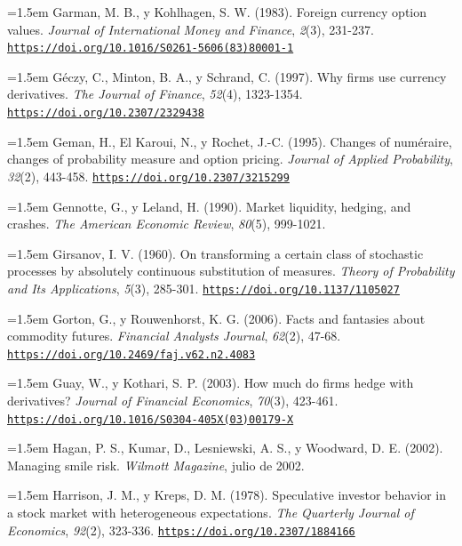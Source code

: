 \documentclass[10pt,a4paper]{article}
\begin{document}
\noindent\hangindent=1.5em Garman, M. B., y Kohlhagen, S. W. (1983). Foreign currency option values. \textit{Journal of International Money and Finance}, \textit{2}(3), 231-237. \href{https://doi.org/10.1016/S0261-5606(83)80001-1}{\nolinkurl{https://doi.org/10.1016/S0261-5606(83)80001-1}}

\noindent\hangindent=1.5em Géczy, C., Minton, B. A., y Schrand, C. (1997). Why firms use currency derivatives. \textit{The Journal of Finance}, \textit{52}(4), 1323-1354. \href{https://doi.org/10.2307/2329438}{\nolinkurl{https://doi.org/10.2307/2329438}}

\noindent\hangindent=1.5em Geman, H., El Karoui, N., y Rochet, J.-C. (1995). Changes of numéraire, changes of probability measure and option pricing. \textit{Journal of Applied Probability}, \textit{32}(2), 443-458. \href{https://doi.org/10.2307/3215299}{\nolinkurl{https://doi.org/10.2307/3215299}}

\noindent\hangindent=1.5em Gennotte, G., y Leland, H. (1990). Market liquidity, hedging, and crashes. \textit{The American Economic Review}, \textit{80}(5), 999-1021.

\noindent\hangindent=1.5em Girsanov, I. V. (1960). On transforming a certain class of stochastic processes by absolutely continuous substitution of measures. \textit{Theory of Probability and Its Applications}, \textit{5}(3), 285-301. \href{https://doi.org/10.1137/1105027}{\nolinkurl{https://doi.org/10.1137/1105027}}

\noindent\hangindent=1.5em Gorton, G., y Rouwenhorst, K. G. (2006). Facts and fantasies about commodity futures. \textit{Financial Analysts Journal}, \textit{62}(2), 47-68. \href{https://doi.org/10.2469/faj.v62.n2.4083}{\nolinkurl{https://doi.org/10.2469/faj.v62.n2.4083}}

\noindent\hangindent=1.5em Guay, W., y Kothari, S. P. (2003). How much do firms hedge with derivatives? \textit{Journal of Financial Economics}, \textit{70}(3), 423-461. \href{https://doi.org/10.1016/S0304-405X(03)00179-X}{\nolinkurl{https://doi.org/10.1016/S0304-405X(03)00179-X}}

\noindent\hangindent=1.5em Hagan, P. S., Kumar, D., Lesniewski, A. S., y Woodward, D. E. (2002). Managing smile risk. \textit{Wilmott Magazine}, julio de 2002.

\noindent\hangindent=1.5em Harrison, J. M., y Kreps, D. M. (1978). Speculative investor behavior in a stock market with heterogeneous expectations. \textit{The Quarterly Journal of Economics}, \textit{92}(2), 323-336. \href{https://doi.org/10.2307/1884166}{\nolinkurl{https://doi.org/10.2307/1884166}}
\end{document}
